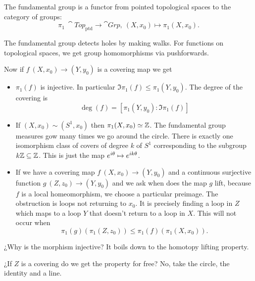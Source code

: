 \documentclass[12pt]{memoir}
\begin{document}
The fundamental group is a functor from pointed topological spaces to the category of groups:
$$\pi_1\:\cat{Top}_{\text{ptd}}\to\cat{Grp},\ (X,x_0)\mapsto \pi_1(X,x_0).$$
\begin{center}
\end{center}
The fundamental group detects holes by making walks. For functions on topological spaces, we get group homomorphisms via pushforwards.\par
Now if $f\:(X,x_0)\to(Y,y_0)$ is a covering map we get
\begin{itemize}
    \item $\pi_1(f)$ is injective. In particular $\Im \pi_1(f)\leq\pi_1(Y,y_0)$. The degree of the covering is 
    $$\deg(f)=[\pi_1(Y,y_0):\Im \pi_1(f)]$$
    \item If $(X,x_0)\sim (S^1,x_0)$ then $\pi_1(X,x_0)\simeq\mathbb{Z}$. The fundamental group measures gow many times we go around the circle. There is exactly one isomorphism class of covers of degree $k$ of $S^1$ corresponding to the subgroup $k\mathbb{Z}\subseteq\mathbb{Z}$. This is just the map $e^{i\theta}\mapsto e^{i k\theta}$.
    \item If we have a covering map $f\: (X,x_0)\to (Y,y_0)$ and a continuous surjective function $g\:(Z,z_0)\to(Y,y_0)$ and we ask when does the map $g$ lift, because $f$ is a local homeomorphism, we choose a particular preimage. The obstruction is loops not returning to $x_0$. It is precisely finding a loop in $Z$ which maps to a loop $Y$ that doesn't return to a loop in $X$. This will not occur when 
    $$\pi_1(g)(\pi_1(Z,z_0))\leq\pi_1(f)(\pi_1(X,x_0)).$$
\end{itemize}

\begin{Qn}
    ¿Why is the morphism injective? It boils down to the homotopy lifting property.
\end{Qn}

\begin{Qn}
    ¿If $Z$ is a covering do we get the property for free? No, take the circle, the identity and a line.
\end{Qn}
\end{document}

